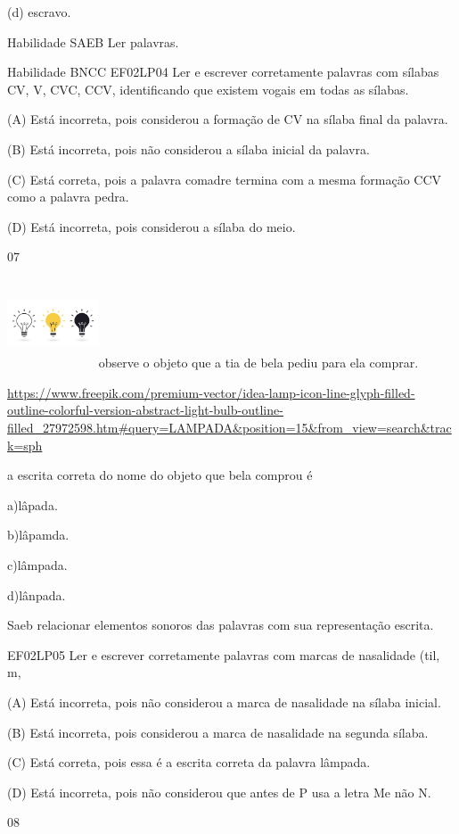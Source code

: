 {{{{{{(d) escravo.

Habilidade SAEB Ler palavras.

Habilidade BNCC EF02LP04 Ler e escrever corretamente palavras com
sílabas CV, V, CVC, CCV, identificando que existem vogais em todas as
sílabas.

(A) Está incorreta, pois considerou a formação de CV na sílaba final da
palavra.

(B) Está incorreta, pois não considerou a sílaba inicial da palavra.

(C) Está correta, pois a palavra comadre termina com a mesma formação
CCV como a palavra pedra.

(D) Está incorreta, pois considerou a sílaba do meio.

\num{07}

\includegraphics[width=1.07025in,height=1.04487in]{media/image178.jpeg}observe
o objeto que a tia de bela pediu para ela comprar.

\url{https://www.freepik.com/premium-vector/idea-lamp-icon-line-glyph-filled-outline-colorful-version-abstract-light-bulb-outline-filled_27972598.htm\#query=LAMPADA\&position=15\&from_view=search\&track=sph}

a escrita correta do nome do objeto que bela comprou é

a)lâpada.

b)lâpamda.

c)lâmpada.

d)lânpada.

Saeb relacionar elementos sonoros das palavras com sua representação
escrita.

EF02LP05 Ler e escrever corretamente palavras com marcas de nasalidade
(til, m,

(A) Está incorreta, pois não considerou a marca de nasalidade na sílaba
inicial.

(B) Está incorreta, pois considerou a marca de nasalidade na segunda
sílaba.

(C) Está correta, pois essa é a escrita correta da palavra lâmpada.

(D) Está incorreta, pois não considerou que antes de P usa a letra Me
não N.

\num{08}

}}}}}}
